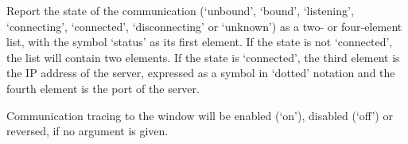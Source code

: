   Report the state of the communication (`unbound', `bound', `listening', `connecting', `connected',
  `disconnecting' or `unknown') as a two- or four-element list, with the symbol `status' as its
  first element.
  If the state is not `connected', the list will contain two elements.
  If the state is `connected', the third element is the IP address of the server, expressed as a
  symbol in `dotted' notation and the fourth element is the port of the server.

  Communication tracing to the \MaxName{} window will be enabled (`on'), disabled (`off') or reversed,
  if no argument is given.
  
  \objListCmdEnd

\objItemFile

\objItemMessage[]

